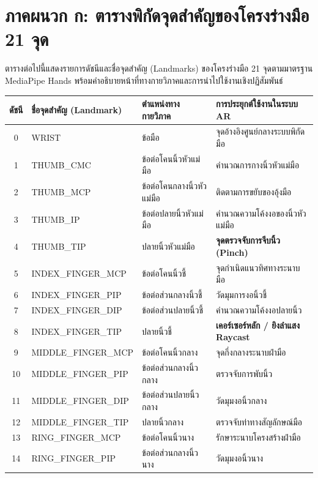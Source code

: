 \chapter*{ภาคผนวก ก: ตารางพิกัดจุดสำคัญของโครงร่างมือ 21 จุด}

ตารางต่อไปนี้แสดงรายการดัชนีและชื่อจุดสำคัญ (Landmarks) ของโครงร่างมือ 21 จุดตามมาตรฐาน MediaPipe Hands พร้อมคำอธิบายหน้าที่ทางกายวิภาคและการนำไปใช้งานเชิงปฏิสัมพันธ์

\vspace{0.4cm}
\begin{table}[htbp]
\centering
\small
\begin{tabularx}{\textwidth}{c >{\ttfamily\small}l p{4.2cm} X}
\toprule
\textbf{ดัชนี} & \textbf{ชื่อจุดสำคัญ (Landmark)} & \textbf{ตำแหน่งทางกายวิภาค} & \textbf{การประยุกต์ใช้งานในระบบ AR} \\
\midrule
0 & WRIST & ข้อมือ & จุดอ้างอิงศูนย์กลางระบบพิกัดมือ \\
1 & THUMB\_CMC & ข้อต่อโคนนิ้วหัวแม่มือ & คำนวณการกางนิ้วหัวแม่มือ \\
2 & THUMB\_MCP & ข้อต่อโคนกลางนิ้วหัวแม่มือ & ติดตามการขยับของอุ้งมือ \\
3 & THUMB\_IP & ข้อต่อปลายนิ้วหัวแม่มือ & คำนวณความโค้งงอของนิ้วหัวแม่มือ \\
4 & THUMB\_TIP & ปลายนิ้วหัวแม่มือ & \textbf{จุดตรวจจับการจีบนิ้ว (Pinch)} \\
5 & INDEX\_FINGER\_MCP & ข้อต่อโคนนิ้วชี้ & จุดกำเนิดแนวทิศทางระนาบมือ \\
6 & INDEX\_FINGER\_PIP & ข้อต่อส่วนกลางนิ้วชี้ & วัดมุมการงอนิ้วชี้ \\
7 & INDEX\_FINGER\_DIP & ข้อต่อส่วนปลายนิ้วชี้ & คำนวณความโค้งงอปลายนิ้ว \\
8 & INDEX\_FINGER\_TIP & ปลายนิ้วชี้ & \textbf{เคอร์เซอร์หลัก / ยิงลำแสง Raycast} \\
9 & MIDDLE\_FINGER\_MCP & ข้อต่อโคนนิ้วกลาง & จุดกึ่งกลางระนาบฝ่ามือ \\
10 & MIDDLE\_FINGER\_PIP & ข้อต่อส่วนกลางนิ้วกลาง & ตรวจจับการพับนิ้ว \\
11 & MIDDLE\_FINGER\_DIP & ข้อต่อส่วนปลายนิ้วกลาง & วัดมุมงอนิ้วกลาง \\
12 & MIDDLE\_FINGER\_TIP & ปลายนิ้วกลาง & ตรวจจับท่าทางสัญลักษณ์มือ \\
13 & RING\_FINGER\_MCP & ข้อต่อโคนนิ้วนาง & รักษาระนาบโครงสร้างฝ่ามือ \\
14 & RING\_FINGER\_PIP & ข้อต่อส่วนกลางนิ้วนาง & วัดมุมงอนิ้วนาง \\

\end{tabularx}
\end{table}
